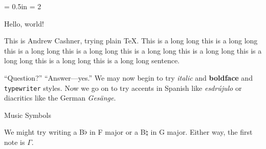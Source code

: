 \parindent = 0.5in
\baselineskip = 2\baselineskip

\beginsection Hello, world!

This is Andrew Cashner, trying plain \TeX.
This is a long long
this is a long long
this is a long long
this is a long long
this is a long long
this is a long long
this is a long long
this is a long long
this is a long long
sentence.

``Question?'' ``Answer---yes.''
We may now begin to try {\it italic} and {\bf boldface} and {\tt typewriter} styles.
Now we go on to try accents in Spanish like {\it esdr\'ujulo} or diacritics like the German {\it Ges\"ange}.

\beginsection Music Symbols 

We might try writing a B$\flat$ in F major or a B$\natural$ in G major.
Either way, the first note is $\Gamma$.

\bye
